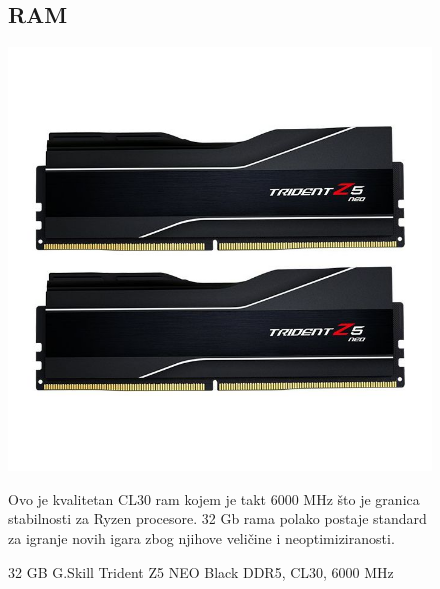 \documentclass{article}
\begin{document}
\begin{figure}[H]
\subsection{RAM}
\centering
\includegraphics[scale=0.2]{Slike/ram.jpg}
\caption{32 GB G.Skill Trident Z5 NEO Black DDR5, CL30, 6000 MHz}
Ovo je kvalitetan CL30 ram kojem je takt 6000 MHz što je granica stabilnosti za Ryzen procesore. 32 Gb rama polako postaje standard za igranje novih igara zbog njihove veličine i neoptimiziranosti.
\end{figure}
\end{document}
